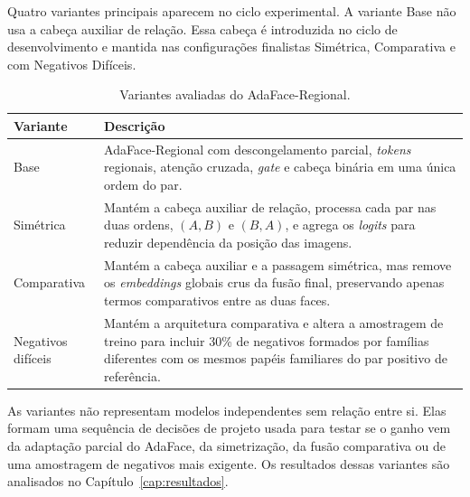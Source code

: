Quatro variantes principais aparecem no ciclo experimental. A variante Base não usa a cabeça auxiliar de relação. Essa cabeça é introduzida no ciclo de desenvolvimento e mantida nas configurações finalistas Simétrica, Comparativa e com Negativos Difíceis.

\begin{table}[htbp]
\centering
\caption{Variantes avaliadas do AdaFace-Regional.}
\label{tab:adaface_regional_variantes}
\begin{tabularx}{\textwidth}{l X}
\hline
\textbf{Variante} & \textbf{Descrição} \\
\hline
Base & AdaFace-Regional com descongelamento parcial, \textit{tokens} regionais, atenção cruzada, \textit{gate} e cabeça binária em uma única ordem do par. \\
Simétrica & Mantém a cabeça auxiliar de relação, processa cada par nas duas ordens, $(A,B)$ e $(B,A)$, e agrega os \textit{logits} para reduzir dependência da posição das imagens. \\
Comparativa & Mantém a cabeça auxiliar e a passagem simétrica, mas remove os \textit{embeddings} globais crus da fusão final, preservando apenas termos comparativos entre as duas faces. \\
Negativos difíceis & Mantém a arquitetura comparativa e altera a amostragem de treino para incluir 30\% de negativos formados por famílias diferentes com os mesmos papéis familiares do par positivo de referência. \\
\hline
\end{tabularx}
\end{table}

As variantes não representam modelos independentes sem relação entre si. Elas formam uma sequência de decisões de projeto usada para testar se o ganho vem da adaptação parcial do AdaFace, da simetrização, da fusão comparativa ou de uma amostragem de negativos mais exigente. Os resultados dessas variantes são analisados no Capítulo~\ref{cap:resultados}.
